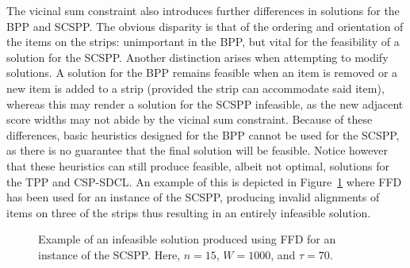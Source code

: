 \documentclass{elsarticle}
\begin{document}
The vicinal sum constraint also introduces further differences in solutions for the BPP and SCSPP. The obvious disparity is that of the ordering and orientation of the items on the strips: unimportant in the BPP, but vital for the feasibility of a solution for the SCSPP. Another distinction arises when attempting to modify solutions. A solution for the BPP remains feasible when an item is removed or a new item is added to a strip (provided the strip can accommodate said item), whereas this may render a solution for the SCSPP infeasible, as the new adjacent score widths may not abide by the vicinal sum constraint. Because of these differences, basic heuristics designed for the BPP cannot be used for the SCSPP, as there is no guarantee that the final solution will be feasible. Notice however that these heuristics can still produce feasible, albeit not optimal, solutions for the TPP and CSP-SDCL. An example of this is depicted in Figure~\ref{fig:ffd} where FFD has been used for an instance of the SCSPP, producing invalid alignments of items on three of the strips thus resulting in an entirely infeasible solution.

\begin{figure}[H]	
	\centering
	
	\caption{Example of an infeasible solution produced using FFD for an instance of the SCSPP. Here, $n = 15$, $W = 1000$, and $\tau = 70$. }	
	\label{fig:ffd}
\end{figure}
\end{document}
